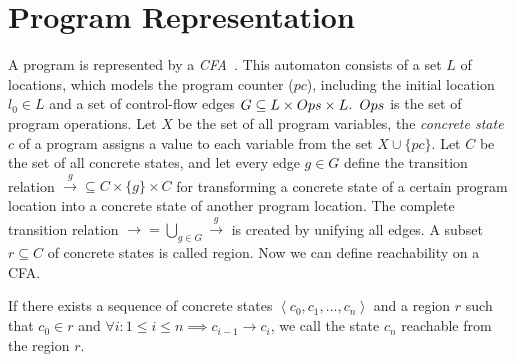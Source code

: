 \section{Program Representation}
A program is represented by a \emph{\ac{CFA}}~\cite{Beyer:CPA}. This automaton consists of a set $L$ of locations,
which models the program counter ($pc$), including the initial location $l_0 \in L$ and a set of control-flow edges $G \subseteq L \times Ops \times 
L$.\,
$Ops$ is the set of program operations.
Let $X$ be the set of all program variables, the \emph{concrete state} $c$ of a program assigns a value to each variable from the set $X \cup \{pc\}$.
Let $C$ be the set of all concrete states, and let every edge $g \in G$ define the transition relation $\xrightarrow{g} \subseteq C \times \{g\} 
\times C$ for transforming a concrete state of a certain program location into a concrete state of another program location.
The complete transition relation $\rightarrow = \bigcup_{g \in G} \xrightarrow{g}$ is created by unifying all edges.
A subset $r \subseteq C$ of concrete states is called region. 
Now we can define reachability on a \ac{CFA}.\\


\begin{note}[Reachability] If there exists a sequence of concrete states $\left< c_0,c_1,...,c_n\right>$ and a region $r$ such that $c_0 \in r$ and $\forall i : 1 \leq i \leq n \implies c_{i-1} \rightarrow c_i$, we call the state $c_n$ reachable from the region $r$.
\end{note}
